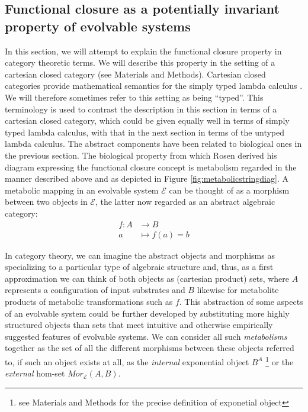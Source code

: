 \subsection*{Functional closure as a potentially invariant property of evolvable systems}

In this section, we will attempt to explain the functional closure property in category theoretic terms. We will describe this property in the setting of a cartesian closed category (see Materials and Methods). Cartesian closed categories provide mathematical semantics for the simply typed lambda calculus \cite{Barendregt1985}. We will therefore sometimes refer to this setting as being ``typed''. This terminology is used to contrast the description in this section in terms of a cartesian closed category, which could be given equally well in terms of simply typed lambda calculus, with that in the next section in terms of the untyped lambda calculus. The abstract components have been related to biological ones in the previous section. The biological property from which Rosen derived his diagram expressing the functional closure concept is metabolism regarded in the manner described above and as depicted in Figure \ref{fig:metabolicstringdiag}. A metabolic mapping in an evolvable system $\mathcal{E}$ can be thought of as a morphism between two objects in $\mathcal{E}$, the latter now regarded as an abstract algebraic category:
\begin{align*}
f \colon A &\longrightarrow B\\
a &\longmapsto f(a)=b
\end{align*}

In category theory, we can imagine the abstract objects and morphisms as specializing to a particular type of algebraic structure and, thus, as a first approximation we can think of both objects as (cartesian product) sets, where $A$ represents a configuration of input substrates and $B$ likewise for metabolite products of metabolic transformations such as $f$. This abstraction of some aspects of an evolvable system could be further developed by substituting more highly structured objects than sets that meet intuitive and otherwise empirically suggested features of evolvable systems. We can consider all such \emph{metabolisms} together as the set of all the different morphisms between these objects referred to, if such an object exists at all, as the \emph{internal} exponential object $B^A$ \footnote{see Materials and Methods for the precise definition of exponetial object} or the \emph{external} hom-set $Mor_{\mathcal{E}}(A,B)$.

